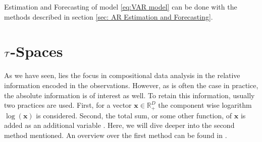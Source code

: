 Estimation and Forecasting of model \ref{eq:VAR model} can be done with the methods described in section \ref{sec: AR Estimation and Forecasting}.
%
%
%
%

\section{$\mathcal{T}$-Spaces}
\label{sec: Tspaces}

As we have seen, lies the focus in compositional data analysis in the relative information encoded in the observations. However, as is often the case in practice, the absolute information is of interest as well. To retain this information, usually two practices are used. First, for a vector $\bm{x} \in \mathbb{R}^D_+$ the component wise logarithm $\log(\bm{x})$ is considered. Second, the total sum, or some other function, of $\bm{x}$ is added as an additional variable \cite{Pawlowsky:2013}. Here, we will dive deeper into the second method mentioned. An overview over the first method can be found in \cite{Pawlowsky:2013}. 

